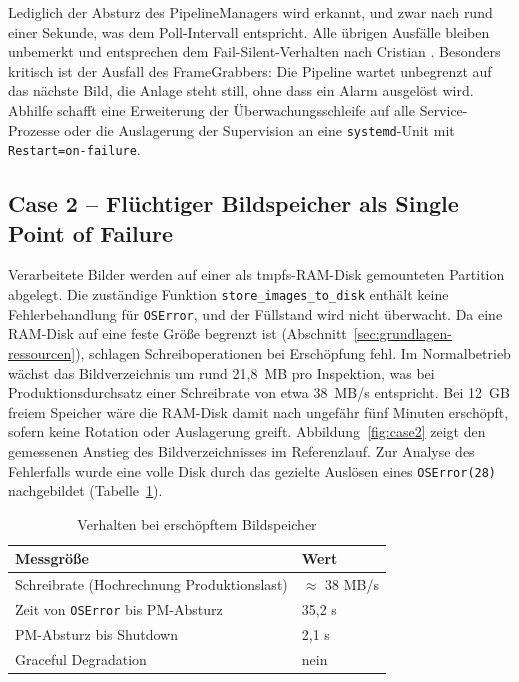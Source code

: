 Lediglich der Absturz des PipelineManagers wird erkannt, und zwar nach rund einer Sekunde,
was dem Poll-Intervall entspricht. Alle übrigen Ausfälle bleiben unbemerkt und entsprechen
dem Fail-Silent-Verhalten nach Cristian \cite{cristian1991}. Besonders kritisch ist der
Ausfall des FrameGrabbers: Die Pipeline wartet unbegrenzt auf das nächste Bild, die Anlage
steht still, ohne dass ein Alarm ausgelöst wird. Abhilfe schafft eine Erweiterung der
Überwachungsschleife auf alle Service-Prozesse oder die Auslagerung der Supervision an
eine \texttt{systemd}-Unit mit \texttt{Restart=on-failure}.

\subsection{Case 2 -- Flüchtiger Bildspeicher als Single Point of Failure}
\label{sec:case2}

Verarbeitete Bilder werden auf einer als tmpfs-RAM-Disk gemounteten Partition abgelegt.
Die zuständige Funktion \texttt{store\_images\_to\_disk} enthält keine Fehlerbehandlung für
\texttt{OSError}, und der Füllstand wird nicht überwacht. Da eine RAM-Disk auf eine feste
Größe begrenzt ist (Abschnitt~\ref{sec:grundlagen-ressourcen}), schlagen
Schreiboperationen bei Erschöpfung fehl. Im Normalbetrieb wächst das Bildverzeichnis um
rund 21,8~MB pro Inspektion, was bei Produktionsdurchsatz einer Schreibrate von etwa
38~MB/s entspricht. Bei 12~GB freiem Speicher wäre die RAM-Disk damit nach ungefähr fünf
Minuten erschöpft, sofern keine Rotation oder Auslagerung greift. Abbildung~\ref{fig:case2}
zeigt den gemessenen Anstieg des Bildverzeichnisses im Referenzlauf. Zur Analyse des
Fehlerfalls wurde eine volle Disk durch das gezielte Auslösen eines \texttt{OSError(28)}
nachgebildet (Tabelle~\ref{tab:case2}).

\begin{table}[htbp]
    \centering
    \caption{Verhalten bei erschöpftem Bildspeicher}
    \label{tab:case2}
    \begin{tabularx}{\textwidth}{lX}
        \hline
        \textbf{Messgröße} & \textbf{Wert} \\
        \hline
        Schreibrate (Hochrechnung Produktionslast) & $\approx$ 38 MB/s \\
        Zeit von \texttt{OSError} bis PM-Absturz   & 35,2 s \\
        PM-Absturz bis Shutdown                    & 2,1 s \\
        Graceful Degradation                       & nein \\
        \hline
    \end{tabularx}
\end{table}

